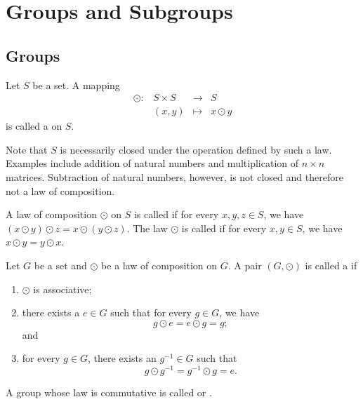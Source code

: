 \chapter{Groups and Subgroups}

\section{Groups}

\begin{defn}
Let $ S $ be a set. A mapping
\begin{equation*}
    \begin{array}{rccc}
        \odot: & S\times S & \to & S \\
        & (x,y) & \mapsto & x\odot y
    \end{array}
\end{equation*}
is called a  on $ S $.
\end{defn}

Note that $ S $ is necessarily closed under the operation defined by such a law. Examples include addition of natural numbers and multiplication of $ n\times n $ matrices. Subtraction of natural numbers, however, is not closed and therefore not a law of composition.

\begin{defn}
A law of composition $ \odot $ on $ S $ is called  if for every $ x,y,z\in S $, we have $ (x\odot y)\odot z=x\odot(y\odot z) $. The law $ \odot $ is called  if for every $ x,y\in S $, we have $ x\odot y=y\odot x $.
\end{defn}

\begin{defn}
Let $ G $ be a set and $ \odot $ be a law of composition on $ G $. A pair $ (G,\odot) $ is called a  if
\begin{enumerate}
    \item $ \odot $ is associative;
    \item there exists a  $ e\in G $ such that for every $ g\in G $, we have
    \begin{equation*}
        g\odot e=e\odot g=g;
    \end{equation*}
    and
    \item for every $ g\in G $, there exists an  $ g^{-1}\in G $ such that
    \begin{equation*}
        g\odot g^{-1}=g^{-1}\odot g=e.
    \end{equation*}
\end{enumerate}
A group whose law is commutative is called  or .
\end{defn}

